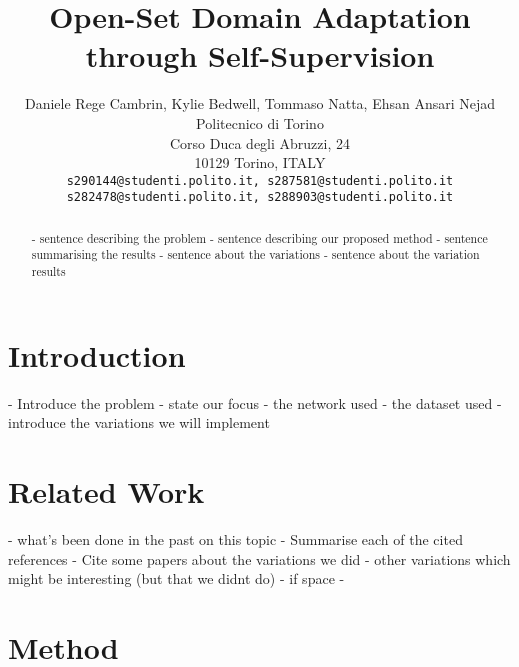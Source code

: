 \documentclass[10pt,twocolumn,letterpaper]{article}
\begin{document}
\title{Open-Set Domain Adaptation through Self-Supervision}

\author{Daniele Rege Cambrin, Kylie Bedwell, Tommaso Natta, Ehsan Ansari Nejad\\
Politecnico di Torino\\
Corso Duca degli Abruzzi, 24\\
10129 Torino, ITALY\\
{\tt\small s290144@studenti.polito.it, s287581@studenti.polito.it} \\
{\tt\small s282478@studenti.polito.it, s288903@studenti.polito.it}
}
\maketitle

\begin{abstract}
   - sentence describing the problem
 - sentence describing our proposed method
 - sentence summarising the results
 - sentence about the variations
 - sentence about the variation results
\end{abstract}

\section{Introduction}
\label{sec:intro}

- Introduce the problem
- state our focus
- the network used
- the dataset used
- introduce the variations we will implement

\section{Related Work}
\label{sec:relatedWork}

- what's been done in the past on this topic
 - Summarise each of the cited references
- Cite some papers about the variations we did
 - other variations which might be interesting (but that we didnt do) - if space
- 

\section{Method}
\label{sec:method}
\end{document}
